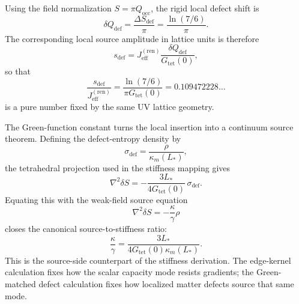 \documentclass[11pt]{article}
\begin{document}
Using the field normalization $S=\pi Q_{\mathrm{occ}}$, the rigid local defect shift is
\[
\delta Q_{\mathrm{def}}=\frac{\Delta S_{\mathrm{def}}}{\pi}
=
\frac{\ln(7/6)}{\pi}.
\]
The corresponding local source amplitude in lattice units is therefore
\[
s_{\mathrm{def}}
=
J_{\mathrm{eff}}^{(\mathrm{ren})}
\frac{\delta Q_{\mathrm{def}}}{G_{\mathrm{tet}}(0)},
\]
so that
\[
\frac{s_{\mathrm{def}}}{J_{\mathrm{eff}}^{(\mathrm{ren})}}
=
\frac{\ln(7/6)}{\pi G_{\mathrm{tet}}(0)}
=
0.109472228\ldots
\]
is a pure number fixed by the same UV lattice geometry.

The Green-function constant turns the local insertion into a continuum source theorem. Defining the defect-entropy density by
\[
\sigma_{\mathrm{def}}=\frac{\rho}{\kappa_m(L_*)},
\]
the tetrahedral projection used in the stiffness mapping gives
\[
\nabla^2\delta S
=
-\frac{3L_*}{4G_{\mathrm{tet}}(0)}\,\sigma_{\mathrm{def}}.
\]
Equating this with the weak-field source equation
\[
\nabla^2\delta S=-\frac{\kappa}{\gamma}\rho
\]
closes the canonical source-to-stiffness ratio:
\[
\boxed{
\frac{\kappa}{\gamma}
=
\frac{3L_*}{4G_{\mathrm{tet}}(0)\kappa_m(L_*)}
}.
\]
This is the source-side counterpart of the stiffness derivation. The edge-kernel calculation fixes how the scalar capacity mode resists gradients; the Green-matched defect calculation fixes how localized matter defects source that same mode.
\end{document}
